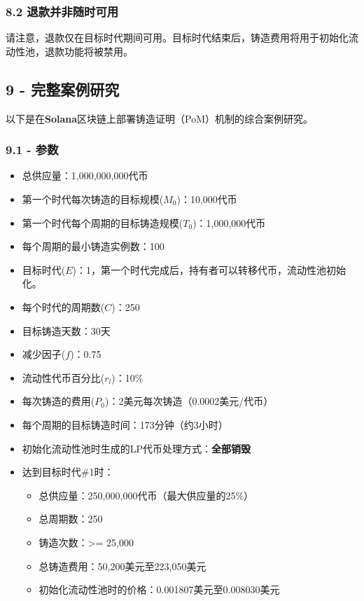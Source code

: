 \documentclass[
]{article}
\providecommand{\tightlist}{%
  \setlength{\itemsep}{0pt}\setlength{\parskip}{0pt}}
\begin{document}
\subsubsection{8.2
退款并非随时可用}\label{ux9000ux6b3eux5e76ux975eux968fux65f6ux53efux7528}

请注意，退款仅在目标时代期间可用。目标时代结束后，铸造费用将用于初始化流动性池，退款功能将被禁用。

\subsection{9 -
完整案例研究}\label{ux5b8cux6574ux6848ux4f8bux7814ux7a76}

以下是在\textbf{Solana}区块链上部署铸造证明（PoM）机制的综合案例研究。

\subsubsection{9.1 - 参数}\label{ux53c2ux6570}

\begin{itemize}
\tightlist
\item
  总供应量：1,000,000,000代币
\item
  第一个时代每次铸造的目标规模(\(M_0\))：10,000代币
\item
  第一个时代每个周期的目标铸造规模(\(T_0\))：1,000,000代币
\item
  每个周期的最小铸造实例数：100
\item
  目标时代(\(E\))：1，第一个时代完成后，持有者可以转移代币，流动性池初始化。
\item
  每个时代的周期数(\(C\))：250
\item
  目标铸造天数：30天
\item
  减少因子(\(f\))：0.75
\item
  流动性代币百分比(\(r_l\))：10\%
\item
  每次铸造的费用(\(P_0\))：2美元每次铸造（0.0002美元/代币）
\item
  每个周期的目标铸造时间：173分钟（约3小时）
\item
  初始化流动性池时生成的LP代币处理方式：\textbf{全部销毁}
\item
  达到目标时代\#1时：

  \begin{itemize}
  \tightlist
  \item
    总供应量：250,000,000代币（最大供应量的25\%）
  \item
    总周期数：250
  \item
    铸造次数：\textgreater= 25,000
  \item
    总铸造费用：50,200美元至223,050美元
  \item
    初始化流动性池时的价格：0.001807美元至0.008030美元
  \end{itemize}
\end{itemize}
\end{document}

